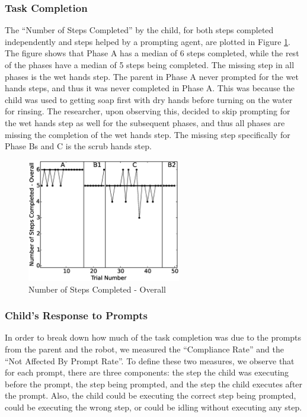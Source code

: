 \subsubsection{Task Completion}
The ``Number of Steps Completed'' by the child, for both steps completed independently and steps helped by a prompting agent, are plotted in Figure \ref{fig:0NumberofStepsCompleted-Overall}.  The figure shows that Phase A has a median of 6 steps completed, while the rest of the phases have a median of 5 steps being completed.  The missing step in all phases is the wet hands step.  The parent in Phase A never prompted for the wet hands steps, and thus it was never completed in Phase A.  This was because the child was used to getting soap first with dry hands before turning on the water for rinsing.  The researcher, upon observing this, decided to skip prompting for the wet hands step as well for the subsequent phases, and thus all phases are missing the completion of the wet hands step.  The missing step specifically for Phase Bs and C is the scrub hands step.
\begin{figure} [h]
	\centering
	\includegraphics[width=0.6\textwidth]{./img/data_analysis/0NumberofStepsCompleted-Overall.eps}
	\caption{Number of Steps Completed - Overall}
	\label{fig:0NumberofStepsCompleted-Overall}
\end{figure}

\subsubsection{Child's Response to Prompts}
In order to break down how much of the task completion was due to the prompts from the parent and the robot, we measured the ``Compliance Rate'' and the ``Not Affected By Prompt Rate''.  To define these two measures, we observe that for each prompt, there are three components: the step the child was executing before the prompt, the step being prompted, and the step the child executes after the prompt.  Also, the child could be executing the correct step being prompted, could be executing the wrong step, or could be idling without executing any step.

